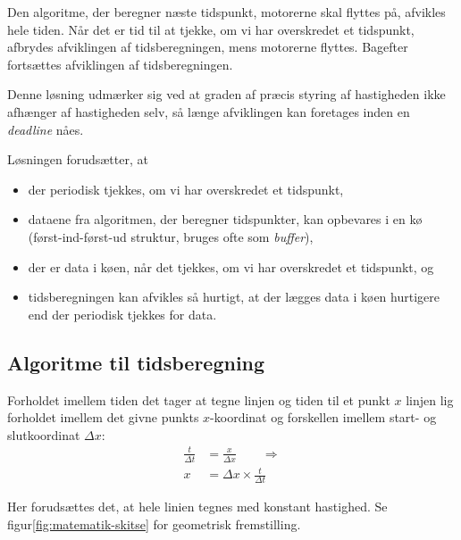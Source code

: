 Den algoritme, der beregner næste tidspunkt, motorerne skal flyttes
på, afvikles hele tiden. Når det er tid til at tjekke, om vi har
overskredet et tidspunkt, afbrydes afviklingen af tidsberegningen,
mens motorerne flyttes. Bagefter fortsættes afviklingen af
tidsberegningen.

Denne løsning udmærker sig ved at graden af præcis styring af
hastigheden ikke afhænger af hastigheden selv, så længe afviklingen
kan foretages inden en \textit{deadline} nåes.

Løsningen forudsætter, at
\begin{itemize} \firmlist
\item der periodisk tjekkes, om vi har overskredet et tidspunkt,
\item dataene fra algoritmen, der beregner tidspunkter, kan opbevares
  i en kø (først-ind-først-ud struktur, bruges ofte som
  \textit{buffer}),
\item der er data i køen, når det tjekkes, om vi har overskredet et
  tidspunkt, og
\item tidsberegningen kan afvikles så hurtigt, at der lægges data i
  køen hurtigere end der periodisk tjekkes for data.
\end{itemize}


\subsection{Algoritme til tidsberegning}


Forholdet imellem tiden det tager at tegne linjen og tiden til et
punkt $x$ linjen lig forholdet imellem det givne punkts $x$-koordinat
og forskellen imellem start- og slutkoordinat $\Delta x$:
\begin{align}
  \frac{t}{\Delta t} &= \frac{x}{\Delta x} \qquad \Rightarrow \nonumber \\
  x &= \Delta x \times \frac{t}{\Delta t} \label{eq:x-af-dxtdt}
\end{align}

Her forudsættes det, at hele linien tegnes med konstant hastighed. Se
figur\vref{fig:matematik-skitse} for geometrisk fremstilling.

